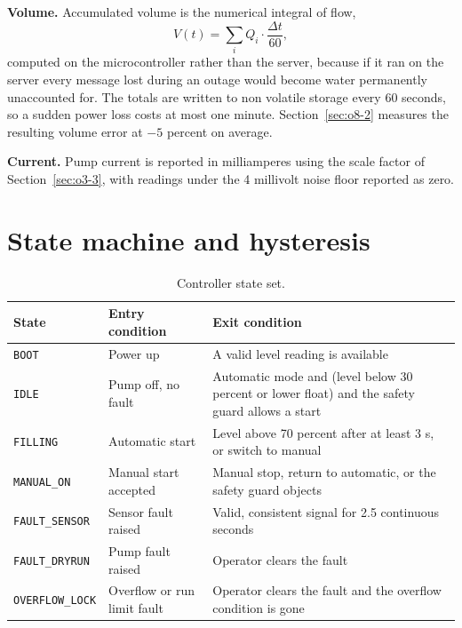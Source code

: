 \textbf{Volume.} Accumulated volume is the numerical integral of flow,
\begin{equation}
V(t) = \sum_{i} Q_i \cdot \frac{\Delta t}{60},
\label{eq:volume}
\end{equation}
computed on the microcontroller rather than the server, because if it ran on the server every message lost during an outage would become water permanently unaccounted for. The totals are written to non volatile storage every 60 seconds, so a sudden power loss costs at most one minute. Section~\ref{sec:o8-2} measures the resulting volume error at $-5$ percent on average.

\textbf{Current.} Pump current is reported in milliamperes using the scale factor of Section~\ref{sec:o3-3}, with readings under the 4 millivolt noise floor reported as zero.

\section{State machine and hysteresis}
\label{sec:o6-3}

\begin{table}[H]
\caption{Controller state set.}
\label{tab:fsm}
\centering
\renewcommand{\arraystretch}{1.1}
\begin{tabular}{|p{3.1cm}|p{4.6cm}|p{5.2cm}|}
\hline
\textbf{State} & \textbf{Entry condition} & \textbf{Exit condition} \\
\hline
\texttt{BOOT} & Power up & A valid level reading is available \\
\hline
\texttt{IDLE} & Pump off, no fault & Automatic mode and (level below 30 percent or lower float) and the safety guard allows a start \\
\hline
\texttt{FILLING} & Automatic start & Level above 70 percent after at least 3 s, or switch to manual \\
\hline
\texttt{MANUAL\_ON} & Manual start accepted & Manual stop, return to automatic, or the safety guard objects \\
\hline
\texttt{FAULT\_SENSOR} & Sensor fault raised & Valid, consistent signal for 2.5 continuous seconds \\
\hline
\texttt{FAULT\_DRYRUN} & Pump fault raised & Operator clears the fault \\
\hline
\texttt{OVERFLOW\_LOCK} & Overflow or run limit fault & Operator clears the fault and the overflow condition is gone \\
\hline
\end{tabular}
\end{table}

